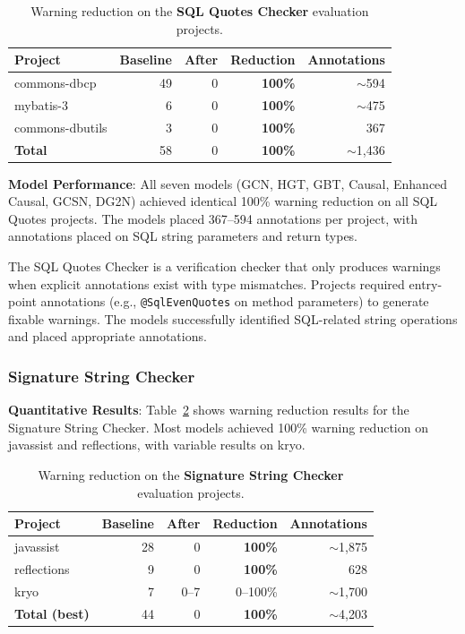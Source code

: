 \documentclass[acmsmall,screen,review,anonymous]{acmart}
\makeatletter
\newcommand{\atmark}[1]{\texttt{@#1}}
\makeatother
\begin{document}
\begin{table}[t]
\caption{Warning reduction on the \textbf{SQL Quotes Checker} evaluation projects.}
\label{tab:sqlquotes}
\begin{tabular}{lrrrr}
\toprule
\textbf{Project} & \textbf{Baseline} & \textbf{After} & \textbf{Reduction} & \textbf{Annotations} \\
\midrule
commons-dbcp & 49 & 0 & \textbf{100\%} & $\sim$594 \\
mybatis-3 & 6 & 0 & \textbf{100\%} & $\sim$475 \\
commons-dbutils & 3 & 0 & \textbf{100\%} & 367 \\
\midrule
\textbf{Total} & 58 & 0 & \textbf{100\%} & $\sim$1,436 \\
\bottomrule
\end{tabular}
\end{table}

\textbf{Model Performance}: All seven models (GCN, HGT, GBT, Causal, Enhanced Causal, GCSN, DG2N) achieved identical 100\% warning reduction on all SQL Quotes projects. The models placed 367--594 annotations per project, with annotations placed on SQL string parameters and return types.

The SQL Quotes Checker is a verification checker that only produces warnings when explicit annotations exist with type mismatches. Projects required entry-point annotations (e.g., \atmark{SqlEvenQuotes} on method parameters) to generate fixable warnings. The models successfully identified SQL-related string operations and placed appropriate annotations.

\subsubsection{Signature String Checker}
\label{sec:sigresults}

\textbf{Quantitative Results}: Table~\ref{tab:signature} shows warning reduction results for the Signature String Checker. Most models achieved 100\% warning reduction on javassist and reflections, with variable results on kryo.

\begin{table}[t]
\caption{Warning reduction on the \textbf{Signature String Checker} evaluation projects.}
\label{tab:signature}
\begin{tabular}{lrrrr}
\toprule
\textbf{Project} & \textbf{Baseline} & \textbf{After} & \textbf{Reduction} & \textbf{Annotations} \\
\midrule
javassist & 28 & 0 & \textbf{100\%} & $\sim$1,875 \\
reflections & 9 & 0 & \textbf{100\%} & 628 \\
kryo & 7 & 0--7 & 0--100\% & $\sim$1,700 \\
\midrule
\textbf{Total (best)} & 44 & 0 & \textbf{100\%} & $\sim$4,203 \\
\bottomrule
\end{tabular}
\end{table}
\end{document}
